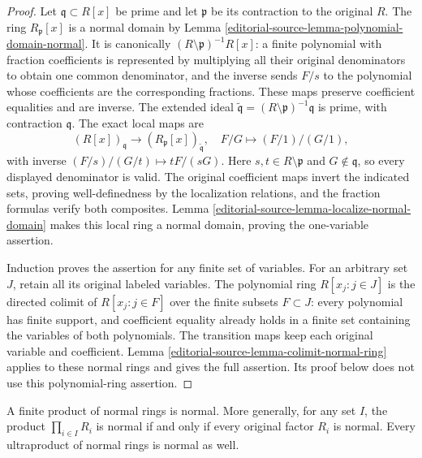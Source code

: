 \begin{proof}
Let $\mathfrak q\subset R[x]$ be prime and let
$\mathfrak p$ be its contraction to the original $R$.
The ring $R_{\mathfrak p}[x]$ is a normal domain by
Lemma \ref{editorial-source-lemma-polynomial-domain-normal}. It is canonically
$(R\setminus\mathfrak p)^{-1}R[x]$: a finite polynomial with
fraction coefficients is represented by multiplying all their
original denominators to obtain one common denominator, and
the inverse sends $F/s$ to the polynomial whose coefficients
are the corresponding fractions. These maps preserve coefficient
equalities and are inverse. The extended ideal
$\widetilde{\mathfrak q}=(R\setminus\mathfrak p)^{-1}\mathfrak q$
is prime, with contraction $\mathfrak q$. The exact local maps are
$$
(R[x])_{\mathfrak q}\longrightarrow
(R_{\mathfrak p}[x])_{\widetilde{\mathfrak q}},
\quad F/G\longmapsto(F/1)/(G/1),
$$
with inverse $(F/s)/(G/t)\mapsto tF/(sG)$.
Here $s,t\in R\setminus\mathfrak p$ and $G\notin\mathfrak q$,
so every displayed denominator is valid. The original coefficient
maps invert the indicated sets, proving well-definedness by the
localization relations, and the fraction formulas verify both
composites. Lemma \ref{editorial-source-lemma-localize-normal-domain} makes this
local ring a normal domain, proving the one-variable assertion.

Induction proves the assertion for any finite set of variables.
For an arbitrary set $J$, retain all its original labeled variables.
The polynomial ring $R[x_j:j\in J]$ is the directed colimit of
$R[x_j:j\in F]$ over the finite subsets $F\subset J$:
every polynomial has finite support, and coefficient equality
already holds in a finite set containing the variables of both
polynomials. The transition maps keep each original variable and
coefficient. Lemma \ref{editorial-source-lemma-colimit-normal-ring} applies to
these normal rings and gives the full assertion. Its proof below
does not use this polynomial-ring assertion.
\end{proof}

\begin{lemma}
\label{editorial-source-lemma-finite-product-normal}
A finite product of normal rings is normal. More generally,
for any set $I$, the product $\prod_{i\in I}R_i$ is normal
if and only if every original factor $R_i$ is normal.
Every ultraproduct of normal rings is normal as well.
\end{lemma}


